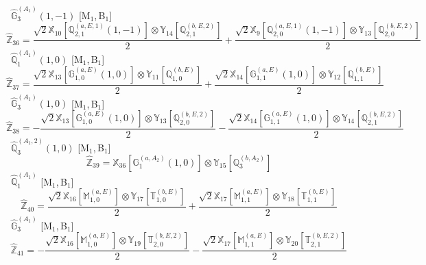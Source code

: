 \documentclass[fleqn,10pt,landscape]{article}
\begin{document}
\begin{itemize}
\noindent {} $\,\,\,\hat{\mathbb{G}}_{3}^{(A_{1})}(1,-1)$ [M$_{1}$,\,B$_{1}$]
\begin{dmath*}
\hat{\mathbb{Z}}_{36}=\frac{\sqrt{2} \mathbb{X}_{10}[\mathbb{Q}_{2,1}^{(a,E,1)}(1,-1)] \otimes\mathbb{Y}_{14}[\mathbb{Q}_{2,1}^{(b,E,2)}]}{2} + \frac{\sqrt{2} \mathbb{X}_{9}[\mathbb{Q}_{2,0}^{(a,E,1)}(1,-1)] \otimes\mathbb{Y}_{13}[\mathbb{Q}_{2,0}^{(b,E,2)}]}{2}
\end{dmath*}
\vspace{4mm}
\noindent {} $\,\,\,\hat{\mathbb{Q}}_{1}^{(A_{1})}(1,0)$ [M$_{1}$,\,B$_{1}$]
\begin{dmath*}
\hat{\mathbb{Z}}_{37}=\frac{\sqrt{2} \mathbb{X}_{13}[\mathbb{G}_{1,0}^{(a,E)}(1,0)] \otimes\mathbb{Y}_{11}[\mathbb{Q}_{1,0}^{(b,E)}]}{2} + \frac{\sqrt{2} \mathbb{X}_{14}[\mathbb{G}_{1,1}^{(a,E)}(1,0)] \otimes\mathbb{Y}_{12}[\mathbb{Q}_{1,1}^{(b,E)}]}{2}
\end{dmath*}
\vspace{4mm}
\noindent {} $\,\,\,\hat{\mathbb{G}}_{3}^{(A_{1})}(1,0)$ [M$_{1}$,\,B$_{1}$]
\begin{dmath*}
\hat{\mathbb{Z}}_{38}=- \frac{\sqrt{2} \mathbb{X}_{13}[\mathbb{G}_{1,0}^{(a,E)}(1,0)] \otimes\mathbb{Y}_{13}[\mathbb{Q}_{2,0}^{(b,E,2)}]}{2} - \frac{\sqrt{2} \mathbb{X}_{14}[\mathbb{G}_{1,1}^{(a,E)}(1,0)] \otimes\mathbb{Y}_{14}[\mathbb{Q}_{2,1}^{(b,E,2)}]}{2}
\end{dmath*}
\vspace{4mm}
\noindent {} $\,\,\,\hat{\mathbb{Q}}_{3}^{(A_{1},2)}(1,0)$ [M$_{1}$,\,B$_{1}$]
\begin{dmath*}
\hat{\mathbb{Z}}_{39}=\mathbb{X}_{36}[\mathbb{G}_{1}^{(a,A_{2})}(1,0)] \otimes\mathbb{Y}_{15}[\mathbb{Q}_{3}^{(b,A_{2})}]
\end{dmath*}
\vspace{4mm}
\noindent {} $\,\,\,\hat{\mathbb{Q}}_{1}^{(A_{1})}$ [M$_{1}$,\,B$_{1}$]
\begin{dmath*}
\hat{\mathbb{Z}}_{40}=\frac{\sqrt{2} \mathbb{X}_{16}[\mathbb{M}_{1,0}^{(a,E)}] \otimes\mathbb{Y}_{17}[\mathbb{T}_{1,0}^{(b,E)}]}{2} + \frac{\sqrt{2} \mathbb{X}_{17}[\mathbb{M}_{1,1}^{(a,E)}] \otimes\mathbb{Y}_{18}[\mathbb{T}_{1,1}^{(b,E)}]}{2}
\end{dmath*}
\vspace{4mm}
\noindent {} $\,\,\,\hat{\mathbb{G}}_{3}^{(A_{1})}$ [M$_{1}$,\,B$_{1}$]
\begin{dmath*}
\hat{\mathbb{Z}}_{41}=- \frac{\sqrt{2} \mathbb{X}_{16}[\mathbb{M}_{1,0}^{(a,E)}] \otimes\mathbb{Y}_{19}[\mathbb{T}_{2,0}^{(b,E,2)}]}{2} - \frac{\sqrt{2} \mathbb{X}_{17}[\mathbb{M}_{1,1}^{(a,E)}] \otimes\mathbb{Y}_{20}[\mathbb{T}_{2,1}^{(b,E,2)}]}{2}

\end{dmath*}
\end{itemize}
\end{document}
